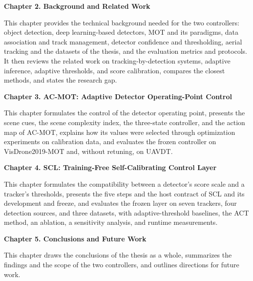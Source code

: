 \textbf{Chapter 2. Background and Related Work}

This chapter provides the technical background needed for the two controllers: object detection, deep learning-based detectors, MOT and its paradigms, data association and track management, detector confidence and thresholding, aerial tracking and the datasets of the thesis, and the evaluation metrics and protocols. It then reviews the related work on tracking-by-detection systems, adaptive inference, adaptive thresholds, and score calibration, compares the closest methods, and states the research gap.

\textbf{Chapter 3. AC-MOT: Adaptive Detector Operating-Point Control}

This chapter formulates the control of the detector operating point, presents the scene cues, the scene complexity index, the three-state controller, and the action map of AC-MOT, explains how its values were selected through optimization experiments on calibration data, and evaluates the frozen controller on VisDrone2019-MOT and, without retuning, on UAVDT.

\textbf{Chapter 4. SCL: Training-Free Self-Calibrating Control Layer}

This chapter formulates the compatibility between a detector's score scale and a tracker's thresholds, presents the five steps and the host contract of SCL and its development and freeze, and evaluates the frozen layer on seven trackers, four detection sources, and three datasets, with adaptive-threshold baselines, the ACT method, an ablation, a sensitivity analysis, and runtime measurements.

\textbf{Chapter 5. Conclusions and Future Work}

This chapter draws the conclusions of the thesis as a whole, summarizes the findings and the scope of the two controllers, and outlines directions for future work.
